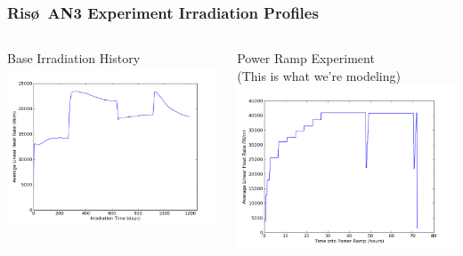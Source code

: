 \begin{frame}
\frametitle{Ris\o~AN3 Experiment Irradiation Profiles}

\begin{columns}
 \begin{column}{0.5\textwidth}
  \centering
  Base Irradiation History
  \includegraphics[width=1.\textwidth]{./base_irrad.png}
 \end{column}
 \begin{column}{0.5\textwidth}
  \centering
  Power Ramp Experiment \\ (This is what we're modeling)
  \includegraphics[width=1.\textwidth]{./power_ramp.png}
 \end{column}
\end{columns}

\end{frame}
